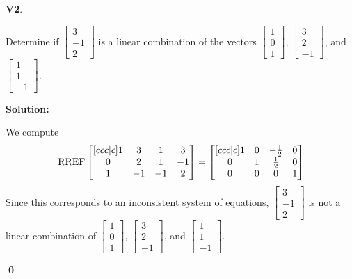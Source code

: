 \documentclass{article}
\newenvironment{problem}[1]
{
  \begin{flushleft}
  \textbf{#1}.
  \ignorespaces
}
{
  \end{flushleft}
}
\newenvironment{solution}
{
  \ignorespaces
  \textbf{Solution:}
}
{
  \ignorespacesafterend
  \begin{flushright}
  {\bfseries \qed}
  \end{flushright}
}
\begin{document}
\begin{problem}{V2}
Determine if \(\begin{bmatrix} 3 \\ -1 \\ 2 \end{bmatrix} \) is a linear combination of the vectors
\(\begin{bmatrix} 1 \\ 0 \\ 1 \end{bmatrix} \),
\(\begin{bmatrix} 3 \\ 2 \\ -1 \end{bmatrix} \), and
\(\begin{bmatrix} 1 \\ 1 \\ -1 \end{bmatrix} \).
\end{problem}
\begin{solution}

We compute
\[ \operatorname{RREF}
  \begin{bmatrix}[ccc|c]
  1 & 3 & 1 & 3 \\
  0 & 2 & 1 & -1 \\
  1 & -1 & -1 & 2
  \end{bmatrix}
  =
  \begin{bmatrix}[ccc|c]
  1 & 0 & -\frac{1}{2} & 0 \\
  0 & 1 & \frac{1}{2} & 0 \\
  0 & 0 & 0 & 1
  \end{bmatrix}
\]
Since this corresponds to an inconsistent system of equations, \(\begin{bmatrix} 3 \\ -1 \\ 2 \end{bmatrix} \) is 
not a linear combination of \(\begin{bmatrix} 1 \\ 0 \\ 1 \end{bmatrix} \),
\(\begin{bmatrix} 3 \\ 2 \\ -1 \end{bmatrix} \), and
\(\begin{bmatrix} 1 \\ 1 \\ -1 \end{bmatrix} \).

\end{solution}
\end{document}
